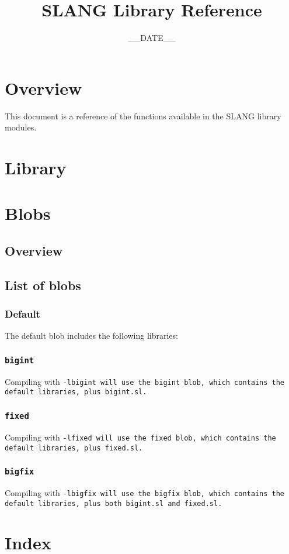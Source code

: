 \documentclass[twocolumn]{article}
\title{SLANG Library Reference}
\date{__DATE__}
\begin{document}
\maketitle
\tableofcontents
\newpage

\section{Overview}

This document is a reference of the functions available in the SLANG library modules.

\section{Library}



\section{Blobs}

\subsection{Overview}

\subsection{List of blobs}

\subsubsection{Default}

The default blob includes the following libraries:



\subsubsection{\tt{bigint}}

Compiling with \tt{-lbigint} will use the \tt{bigint} blob, which
contains the default libraries, plus \tt{bigint.sl}.

\subsubsection{\tt{fixed}}

Compiling with \tt{-lfixed} will use the \tt{fixed} blob, which
contains the default libraries, plus \tt{fixed.sl}.

\subsubsection{\tt{bigfix}}

Compiling with \tt{-lbigfix} will use the \tt{bigfix} blob, which
contains the default libraries, plus both \tt{bigint.sl} and \tt{fixed.sl}.


\section{Index}
\printindex
\end{document}
